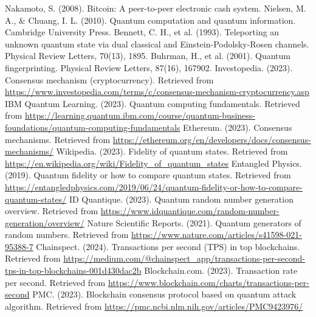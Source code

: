 \documentclass[11pt,a4paper]{article}
\begin{document}
\newpage
\begin{thebibliography}{9}
Nakamoto, S. (2008). Bitcoin: A peer-to-peer electronic cash system.
Nielsen, M. A., \& Chuang, I. L. (2010). Quantum computation and quantum information. Cambridge University Press.
Bennett, C. H., et al. (1993). Teleporting an unknown quantum state via dual classical and Einstein-Podolsky-Rosen channels. Physical Review Letters, 70(13), 1895.
Buhrman, H., et al. (2001). Quantum fingerprinting. Physical Review Letters, 87(16), 167902.
Investopedia. (2023). Consensus mechanism (cryptocurrency). Retrieved from \url{https://www.investopedia.com/terms/c/consensus-mechanism-cryptocurrency.asp}
IBM Quantum Learning. (2023). Quantum computing fundamentals. Retrieved from \url{https://learning.quantum.ibm.com/course/quantum-business-foundations/quantum-computing-fundamentals}
Ethereum. (2023). Consensus mechanisms. Retrieved from \url{https://ethereum.org/en/developers/docs/consensus-mechanisms/}
Wikipedia. (2023). Fidelity of quantum states. Retrieved from \url{https://en.wikipedia.org/wiki/Fidelity_of_quantum_states}
Entangled Physics. (2019). Quantum fidelity or how to compare quantum states. Retrieved from \url{https://entangledphysics.com/2019/06/24/quantum-fidelity-or-how-to-compare-quantum-states/}
ID Quantique. (2023). Quantum random number generation overview. Retrieved from \url{https://www.idquantique.com/random-number-generation/overview/}
Nature Scientific Reports. (2021). Quantum generators of random numbers. Retrieved from \url{https://www.nature.com/articles/s41598-021-95388-7}
Chainspect. (2024). Transactions per second (TPS) in top blockchains. Retrieved from \url{https://medium.com/@chainspect_app/transactions-per-second-tps-in-top-blockchains-001d430dac2b}
Blockchain.com. (2023). Transaction rate per second. Retrieved from \url{https://www.blockchain.com/charts/transactions-per-second}
PMC. (2023). Blockchain consensus protocol based on quantum attack algorithm. Retrieved from \url{https://pmc.ncbi.nlm.nih.gov/articles/PMC9423976/}
\end{thebibliography}

\newpage
\printglossaries
\end{document}
